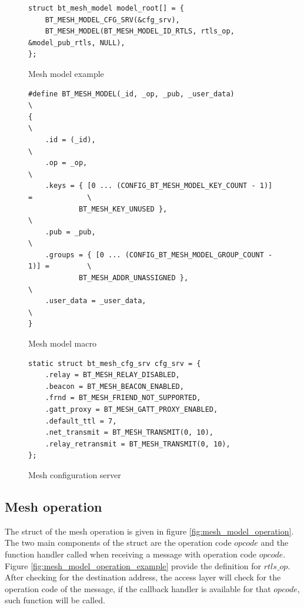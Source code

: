 \documentclass[\main/main.tex]{subfiles}
\begin{document}
\begin{figure}[H]
    \begin{lstlisting}[style=CStyle]
struct bt_mesh_model model_root[] = {
    BT_MESH_MODEL_CFG_SRV(&cfg_srv),
    BT_MESH_MODEL(BT_MESH_MODEL_ID_RTLS, rtls_op, &model_pub_rtls, NULL),
};
    \end{lstlisting}
    \caption{Mesh model example}
    \label{fig:mesh_model_example}
\end{figure}

\begin{figure}[H]
    \begin{lstlisting}[style=CStyle]
#define BT_MESH_MODEL(_id, _op, _pub, _user_data)                            \
{                                                                            \
	.id = (_id),                                                         \
	.op = _op,                                                           \
	.keys = { [0 ... (CONFIG_BT_MESH_MODEL_KEY_COUNT - 1)] =             \
			BT_MESH_KEY_UNUSED },                                \
	.pub = _pub,                                                         \
	.groups = { [0 ... (CONFIG_BT_MESH_MODEL_GROUP_COUNT - 1)] =         \
			BT_MESH_ADDR_UNASSIGNED },                           \
	.user_data = _user_data,                                             \
}
\end{lstlisting}
\caption{Mesh model macro}
\label{fig:mesh_model_macro}
\end{figure}

\begin{figure}[H]
    \begin{lstlisting}[style=CStyle]
static struct bt_mesh_cfg_srv cfg_srv = {
    .relay = BT_MESH_RELAY_DISABLED,
    .beacon = BT_MESH_BEACON_ENABLED,
    .frnd = BT_MESH_FRIEND_NOT_SUPPORTED,
    .gatt_proxy = BT_MESH_GATT_PROXY_ENABLED,
    .default_ttl = 7,
    .net_transmit = BT_MESH_TRANSMIT(0, 10),
    .relay_retransmit = BT_MESH_TRANSMIT(0, 10),
};
\end{lstlisting}
\caption{Mesh configuration server}
\label{fig:mesh_configuration_server}
\end{figure}

\subsection{Mesh operation}
The struct of the mesh operation is given in figure \ref{fig:mesh_model_operation}. The two main components of the struct are the operation code $opcode$ and the function handler called when receiving a message with operation code $opcode$. Figure \ref{fig:mesh_model_operation_example} provide the definition for $rtls\_op$. After checking for the destination address, the access layer will check for the operation code of the message, if the callback handler is available for that $opcode$, such function will be called.
\end{document}
